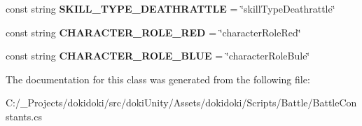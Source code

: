 \begin{DoxyCompactItemize}
\item 
const string {\bfseries S\+K\+I\+L\+L\+\_\+\+T\+Y\+P\+E\+\_\+\+D\+E\+A\+T\+H\+R\+A\+T\+T\+LE} = \char`\"{}skill\+Type\+Deathrattle\char`\"{}\hypertarget{class_battle_constants_a3d2807197ae679f235986b1640cc0f8e}{}\label{class_battle_constants_a3d2807197ae679f235986b1640cc0f8e}

\item 
const string {\bfseries C\+H\+A\+R\+A\+C\+T\+E\+R\+\_\+\+R\+O\+L\+E\+\_\+\+R\+ED} = \char`\"{}character\+Role\+Red\char`\"{}\hypertarget{class_battle_constants_a7ff35e0f883ad55221d130c763a1dddb}{}\label{class_battle_constants_a7ff35e0f883ad55221d130c763a1dddb}

\item 
const string {\bfseries C\+H\+A\+R\+A\+C\+T\+E\+R\+\_\+\+R\+O\+L\+E\+\_\+\+B\+L\+UE} = \char`\"{}character\+Role\+Bule\char`\"{}\hypertarget{class_battle_constants_a4856bc9884581d377cd3bd55b03adad4}{}\label{class_battle_constants_a4856bc9884581d377cd3bd55b03adad4}

\end{DoxyCompactItemize}


The documentation for this class was generated from the following file\+:\begin{DoxyCompactItemize}
\item 
C\+:/\+\_\+\+Projects/dokidoki/src/doki\+Unity/\+Assets/dokidoki/\+Scripts/\+Battle/Battle\+Constants.\+cs\end{DoxyCompactItemize}

